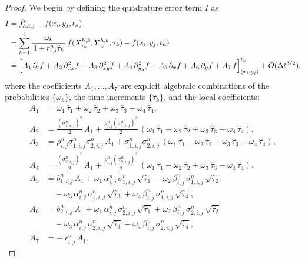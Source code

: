 \documentclass[10pt,a4paper]{amsart}
\begin{document}
	\begin{proof}
		We begin by defining the quadrature error term $I$ as
		\[
		\begin{aligned}
			I &= \hat f_{h,i,j}^n - f(x_i, y_j, t_n) \\
			&= \sum_{k=1}^4 \frac{\omega_k}{\,1 + r_{i,j}^n\hat{\tau}_k\,}\,
			f(X_{\tau_k}^{h,k}, Y_{\tau_k}^{h,k}, \tau_k)
			- f(x_i, y_j, t_n)  \\
			&= \Bigl[ A_1\,\partial_t f + A_2\,\partial_{xx}^2 f + A_3\,\partial_{xy}^2 f
			+ A_4\,\partial_{yy}^2 f + A_5\,\partial_x f + A_6\,\partial_y f + A_7\,f \Bigr]_{(x_i,y_j)}^{t_n}
			+ O(\Delta t^{3/2}),
		\end{aligned}
		\]
		where the coefficients $A_1,\dots,A_7$ are explicit algebraic combinations of the probabilities $\{\omega_k\}$, the time increments $\{\hat\tau_k\}$, and the local coefficients:
		\[
		\begin{aligned}
			A_1 &= \omega_1\,\hat{\tau}_1 + \omega_2\,\hat{\tau}_2
			+ \omega_3\,\hat{\tau}_3 + \omega_4\,\hat{\tau}_4,\\
			A_2 &= \tfrac{(\sigma_{1,i,j}^n)^2}{2}\,A_1 + \tfrac{\rho_{i,j}^n(\sigma_{1,i,j}^n)^2}{2}\,
			(\omega_1\,\hat{\tau}_1 - \omega_2\,\hat{\tau}_2 + \omega_3\,\hat{\tau}_3 - \omega_4\,\hat{\tau}_4),\\
			A_3 &= \rho_{i,j}^n\sigma_{1,i,j}^n\sigma_{2,i,j}^n\,A_1
			+ \sigma_{1,i,j}^n\sigma_{2,i,j}^n\,
			(\omega_1\,\hat{\tau}_1 - \omega_2\,\hat{\tau}_2 + \omega_3\,\hat{\tau}_3 - \omega_4\,\hat{\tau}_4),\\
			A_4 &= \tfrac{(\sigma_{2,i,j}^n)^2}{2}\,A_1 + \tfrac{\rho_{i,j}^n(\sigma_{2,i,j}^n)^2}{2}\,
			(\omega_1\,\hat{\tau}_1 - \omega_2\,\hat{\tau}_2 + \omega_3\,\hat{\tau}_3 - \omega_4\,\hat{\tau}_4),\\
			A_5 &= b_{1,i,j}^n\,A_1 + \omega_1\,\alpha_{i,j}^n\,\sigma_{1,i,j}^n\,\sqrt{\hat\tau_1}
			- \omega_2\,\beta_{i,j}^n\,\sigma_{1,i,j}^n\,\sqrt{\hat\tau_2}\\
			&\quad - \omega_3\,\alpha_{i,j}^n\,\sigma_{1,i,j}^n\,\sqrt{\hat\tau_3}
			+ \omega_4\,\beta_{i,j}^n\,\sigma_{1,i,j}^n\,\sqrt{\hat\tau_4},\\
			A_6 &= b_{2,i,j}^n\,A_1 + \omega_1\,\alpha_{i,j}^n\,\sigma_{2,i,j}^n\,\sqrt{\hat\tau_1}
			+ \omega_2\,\beta_{i,j}^n\,\sigma_{2,i,j}^n\,\sqrt{\hat\tau_2}\\
			&\quad - \omega_3\,\alpha_{i,j}^n\,\sigma_{2,i,j}^n\,\sqrt{\hat\tau_3}
			- \omega_4\,\beta_{i,j}^n\,\sigma_{2,i,j}^n\,\sqrt{\hat\tau_4},\\
			A_7 &= -\,r_{i,j}^n\,A_1.
		\end{aligned}
		\]
		

\end{proof}
\end{document}
